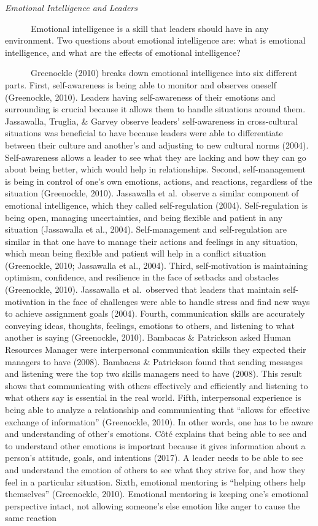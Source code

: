 \documentclass[
  12pt,
]{article}
\begin{document}
\emph{Emotional Intelligence and Leaders}

~~~~~~Emotional intelligence is a skill that leaders should have in any environment. Two questions about emotional intelligence are: what is emotional intelligence, and what are the effects of emotional intelligence?

~~~~~~Greenockle (2010) breaks down emotional intelligence into six different parts. First, self-awareness is being able to monitor and observes oneself (Greenockle, 2010). Leaders having self-awareness of their emotions and surrounding is crucial because it allows them to handle situations around them. Jassawalla, Truglia, \& Garvey observe leaders' self-awareness in cross-cultural situations was beneficial to have because leaders were able to differentiate between their culture and another's and adjusting to new cultural norms (2004). Self-awareness allows a leader to see what they are lacking and how they can go about being better, which would help in relationships. Second, self-management is being in control of one's own emotions, actions, and reactions, regardless of the situation (Greenockle, 2010). Jassawalla et al.~observe a similar component of emotional intelligence, which they called self-regulation (2004). Self-regulation is being open, managing uncertainties, and being flexible and patient in any situation (Jassawalla et al., 2004). Self-management and self-regulation are similar in that one have to manage their actions and feelings in any situation, which mean being flexible and patient will help in a conflict situation (Greenockle, 2010; Jassawalla et al., 2004). Third, self-motivation is maintaining optimism, confidence, and resilience in the face of setbacks and obstacles (Greenockle, 2010). Jassawalla et al.~observed that leaders that maintain self-motivation in the face of challenges were able to handle stress and find new ways to achieve assignment goals (2004). Fourth, communication skills are accurately conveying ideas, thoughts, feelings, emotions to others, and listening to what another is saying (Greenockle, 2010). Bambacas \& Patrickson asked Human Resources Manager were interpersonal communication skills they expected their managers to have (2008). Bambacas \& Patrickson found that sending messages and listening were the top two skills managers need to have (2008). This result shows that communicating with others effectively and efficiently and listening to what others say is essential in the real world. Fifth, interpersonal experience is being able to analyze a relationship and communicating that ``allows for effective exchange of information'' (Greenockle, 2010). In other words, one has to be aware and understanding of other's emotions. Côté explains that being able to see and to understand other emotions is important because it gives information about a person's attitude, goals, and intentions (2017). A leader needs to be able to see and understand the emotion of others to see what they strive for, and how they feel in a particular situation. Sixth, emotional mentoring is ``helping others help themselves'' (Greenockle, 2010). Emotional mentoring is keeping one's emotional perspective intact, not allowing someone's else emotion like anger to cause the same reaction 
\end{document}
